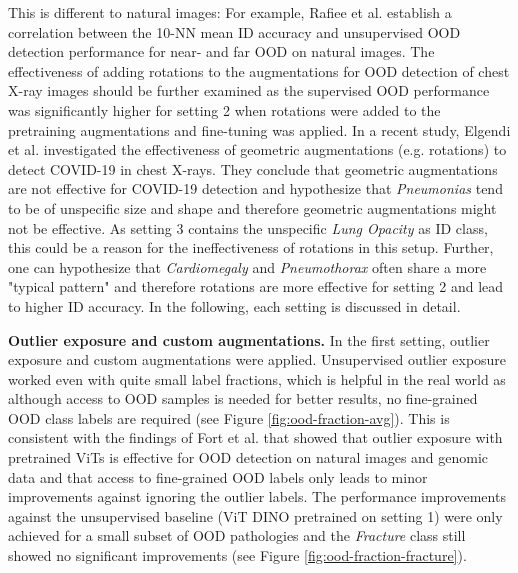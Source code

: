 This is different to natural images: For example, Rafiee et al. \citep{Rafiee2022} establish a correlation between the 10-NN mean ID accuracy and unsupervised OOD detection performance for near- and far OOD on natural images.
The effectiveness of adding rotations to the augmentations for OOD detection of chest X-ray images should be further examined as the supervised OOD performance was significantly higher for setting 2 when rotations were added to the pretraining augmentations and fine-tuning was applied.
In a recent study, Elgendi et al. \citep{Elgendi2021} investigated the effectiveness of geometric augmentations (e.g. rotations) to detect COVID-19 in chest X-rays.
They conclude that geometric augmentations are not effective for COVID-19 detection and hypothesize \citep{Elgendi2021} that \textit{Pneumonias} tend to be of unspecific size and shape and therefore geometric augmentations might not be effective.
As setting 3 contains the unspecific \textit{Lung Opacity} as ID class, this could be a reason for the ineffectiveness of rotations in this setup.
Further, one can hypothesize that \textit{Cardiomegaly} and \textit{Pneumothorax} often share a more "typical pattern" and therefore rotations are more effective for setting 2 and lead to higher ID accuracy.
In the following, each setting is discussed in detail.
\par
\textbf{Outlier exposure and custom augmentations.}
In the first setting, outlier exposure and custom augmentations were applied.
Unsupervised outlier exposure worked even with quite small label fractions, which is helpful in the real world as although access to OOD samples is needed for better results, no fine-grained OOD class labels are required (see Figure \ref{fig:ood-fraction-avg}).
This is consistent with the findings of Fort et al. \citep{Fort2021} that showed that outlier exposure with pretrained ViTs is effective for OOD detection on natural images and genomic data and that access to fine-grained OOD labels only leads to minor improvements against ignoring the outlier labels.
The performance improvements against the unsupervised baseline (ViT DINO pretrained on setting 1) were only achieved for a small subset of OOD pathologies and the \textit{Fracture} class still showed no significant improvements (see Figure \ref{fig:ood-fraction-fracture}).
